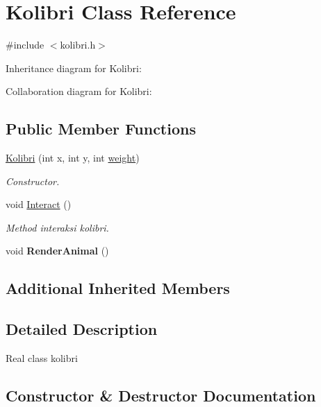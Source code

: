 \hypertarget{classKolibri}{}\section{Kolibri Class Reference}
\label{classKolibri}


{\ttfamily \#include $<$kolibri.\+h$>$}



Inheritance diagram for Kolibri\+:


Collaboration diagram for Kolibri\+:
\subsection*{Public Member Functions}
\begin{DoxyCompactItemize}
\item 
\hyperlink{classKolibri_a8b6a938cb5a62473bb269f4b21562a39}{Kolibri} (int x, int y, int \hyperlink{classAnimal_a9a3b22f243f7109c57f36b3c660feb6e}{weight})
\begin{DoxyCompactList}\small\item\em Constructor. \end{DoxyCompactList}\item 
void \hyperlink{classKolibri_ae2ec0c774b032c11aebcb5e5347d8e5e}{Interact} ()\hypertarget{classKolibri_ae2ec0c774b032c11aebcb5e5347d8e5e}{}\label{classKolibri_ae2ec0c774b032c11aebcb5e5347d8e5e}

\begin{DoxyCompactList}\small\item\em Method interaksi kolibri. \end{DoxyCompactList}\item 
void {\bfseries Render\+Animal} ()\hypertarget{classKolibri_a84cce1f17678f60eb6a750f4b9f4e70e}{}\label{classKolibri_a84cce1f17678f60eb6a750f4b9f4e70e}

\end{DoxyCompactItemize}
\subsection*{Additional Inherited Members}


\subsection{Detailed Description}
Real class kolibri 

\subsection{Constructor \& Destructor Documentation}

